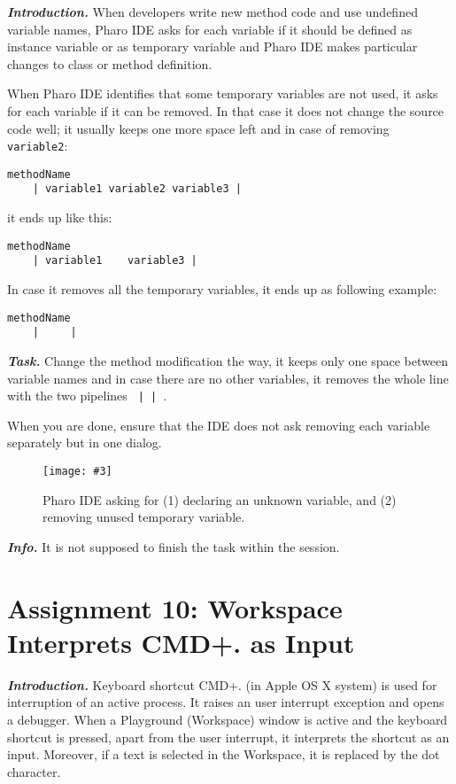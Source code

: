\documentclass[table,a4paper]{article}
\newcommand{\myparagraph}[1]{\vspace{0.3em}\noindent \textbf{\textit{#1.}}}
\newcommand{\ct}[1]{\texttt{#1}}
\newcommand{\fig}[4]{
	\begin{figure}[#1]
		\centering
		\texttt{[image: \#3]}
		\caption{\label{fig:#3}#4}
	\end{figure}}
\begin{document}
\myparagraph{Introduction} When developers write new method code and use undefined variable names, Pharo IDE asks for each variable if it should be defined as instance variable or as temporary variable and Pharo IDE makes particular changes to class or method definition. 

When Pharo IDE identifies that some temporary variables are not used, it asks for each variable if it can be removed. In that case it does not change the source code well; it usually keeps one more space left and in case of removing \ct{variable2}:

\begin{lstlisting} 
methodName
    | variable1 variable2 variable3 |
\end{lstlisting}

it ends up like this:

\begin{lstlisting} 
methodName
    | variable1    variable3 |
\end{lstlisting}

In case it removes all the temporary variables, it ends up as following example:

\begin{lstlisting} 
methodName
    |     |
\end{lstlisting}


\myparagraph{Task} Change the method modification the way, it keeps only one space between variable names and in case there are no other variables, it removes the whole line with the two pipelines \ct{ |  | }. 

When you are done, ensure that the IDE does not ask removing each variable separately but in one dialog. 

\fig{h}{0.6}{variables}{Pharo IDE asking for (1) declaring an unknown variable, and (2) removing unused temporary variable.}

\myparagraph{Info} It is not supposed to finish the task within the session.

\clearpage{}
\section{Assignment 10: Workspace Interprets CMD+. as Input}
\label{sec:a10}

\myparagraph{Introduction} Keyboard shortcut CMD+. (in Apple OS X system) is used for interruption of an active process. It raises an user interrupt exception and opens a debugger. When a Playground (Workspace) window is active and the keyboard shortcut is pressed, apart from the user interrupt, it interprets the shortcut as an input. Moreover, if a text is selected in the Workspace, it is replaced by the dot character.
\end{document}
